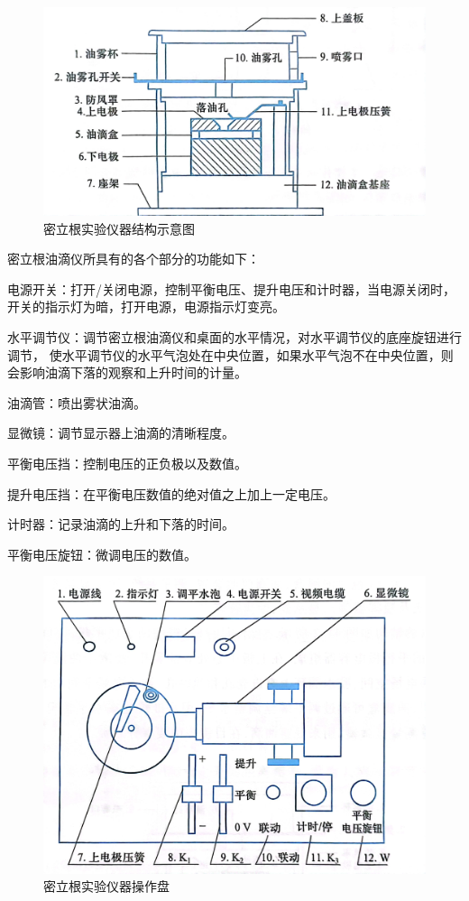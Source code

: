 \documentclass{ctexart}
\begin{document}
\begin{figure}[H]
  \centering
  \includegraphics[height=0.7\textwidth,width=1\textwidth]{yiqijiegou.jpg}
  \caption{密立根实验仪器结构示意图}\label{jiegou}
\end{figure}

密立根油滴仪所具有的各个部分的功能如下：

电源开关：打开/关闭电源，控制平衡电压、提升电压和计时器，当电源关闭时，开关的指示灯为暗，打开电源，电源指示灯变亮。

水平调节仪：调节密立根油滴仪和桌面的水平情况，对水平调节仪的底座旋钮进行调节，
使水平调节仪的水平气泡处在中央位置，如果水平气泡不在中央位置，则会影响油滴下落的观察和上升时间的计量。

油滴管：喷出雾状油滴。

显微镜：调节显示器上油滴的清晰程度。

平衡电压挡：控制电压的正负极以及数值。

提升电压挡：在平衡电压数值的绝对值之上加上一定电压。

计时器：记录油滴的上升和下落的时间。

平衡电压旋钮：微调电压的数值。

\begin{figure}[H]
  \centering
  \includegraphics[height=0.7\textwidth,width=1\textwidth]{caozuopan.jpg}
  \caption{密立根实验仪器操作盘}\label{caozuopan}
\end{figure}
\end{document}
